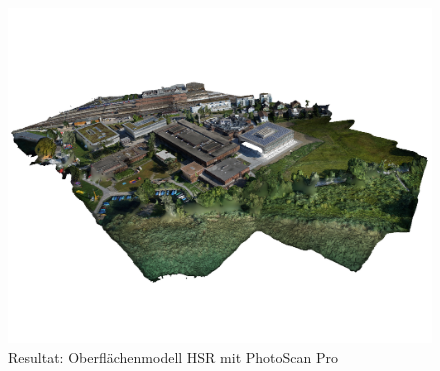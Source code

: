 \begin{figure}[p]
	\centerline{
		\includegraphics[width=15cm]{images/hsr-dsm-photoscan.png}
	}
	\caption{Resultat: Oberflächenmodell HSR mit PhotoScan Pro}
	\label{img:hsr-dsm-pix4d}
\end{figure}

